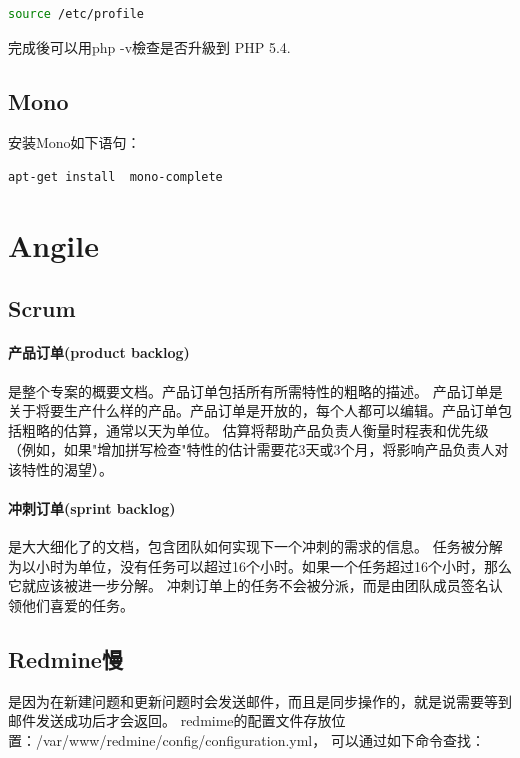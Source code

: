 \documentclass{book}
\begin{document}
\begin{lstlisting}[language=Bash]
source /etc/profile
\end{lstlisting}

完成後可以用php -v檢查是否升級到 PHP 5.4.

\subsection{Mono}

安装Mono如下语句：

\begin{lstlisting}[language=Bash]
apt-get install  mono-complete
\end{lstlisting}

\section{Angile}

\subsection{Scrum}

\paragraph{产品订单(product backlog)}是整个专案的概要文档。产品订单包括所有所需特性的粗略的描述。
产品订单是关于将要生产什么样的产品。产品订单是开放的，每个人都可以编辑。产品订单包括粗略的估算，通常以天为单位。
估算将帮助产品负责人衡量时程表和优先级（例如，如果"增加拼写检查"特性的估计需要花3天或3个月，将影响产品负责人对该特性的渴望）。

\paragraph{冲刺订单(sprint backlog)}是大大细化了的文档，包含团队如何实现下一个冲刺的需求的信息。
任务被分解为以小时为单位，没有任务可以超过16个小时。如果一个任务超过16个小时，那么它就应该被进一步分解。
冲刺订单上的任务不会被分派，而是由团队成员签名认领他们喜爱的任务。

\subsection{Redmine慢}

是因为在新建问题和更新问题时会发送邮件，而且是同步操作的，就是说需要等到邮件发送成功后才会返回。
redmime的配置文件存放位置：/var/www/redmine/config/configuration.yml，
可以通过如下命令查找：
\end{document}
